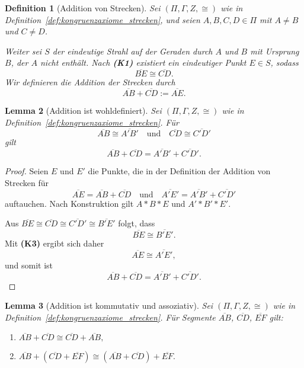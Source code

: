 \documentclass[a4paper,12pt]{article}
\theoremstyle{break}
\newtheorem{definition}{Definition}[section]
\newtheorem{lemma}[definition]{Lemma}
\begin{document}
\begin{definition}[Addition von Strecken]
Sei \((\Pi, \Gamma, Z, \cong)\) wie in Definition~\ref{def:kongruenzaxiome_strecken}, und seien \(A, B, C, D \in \Pi\) mit \(A \neq B\) und \(C \neq D\). 

Weiter sei \(S\) der eindeutige Strahl auf der Geraden durch \(A\) und \(B\) mit Ursprung \(B\), der \(A\) nicht enthält. Nach \textbf{(K1)} existiert ein eindeutiger Punkt \(E \in S\), sodass 
\[
\overline{BE} \cong \overline{CD}.
\]
Wir definieren die Addition der Strecken durch 
\[
\overline{AB} + \overline{CD} := \overline{AE}.
\]
\end{definition}

\begin{lemma}[Addition ist wohldefiniert]\label{lemma:addition_wohldef}
Sei \((\Pi, \Gamma, Z, \cong)\) wie in Definition~\ref{def:kongruenzaxiome_strecken}. Für 
\[
\overline{AB} \cong \overline{A'B'} \quad \text{und} \quad \overline{CD} \cong \overline{C'D'}
\]
gilt 
\[
\overline{AB} + \overline{CD} = \overline{A'B'} + \overline{C'D'}.
\]
\end{lemma}

\begin{proof}
Seien \(E\) und \(E'\) die Punkte, die in der Definition der Addition von Strecken für 
\[
\overline{AE} = \overline{AB} + \overline{CD} \quad \text{und} \quad \overline{A'E'} = \overline{A'B'} + \overline{C'D'}
\]
auftauchen. Nach Konstruktion gilt \(A * B * E\) und \(A' * B' * E'\). 

Aus \(\overline{BE} \cong \overline{CD} \cong \overline{C'D'} \cong \overline{B'E'}\) folgt, dass 
\[
\overline{BE} \cong \overline{B'E'}.
\]
Mit \textbf{(K3)} ergibt sich daher 
\[
\overline{AE} \cong \overline{A'E'},
\]
und somit ist 
\[
\overline{AB} + \overline{CD} = \overline{A'B'} + \overline{C'D'}.
\]
\end{proof}

\begin{lemma}[Addition ist kommutativ und assoziativ]\label{lemma:addition_komm_ass}
Sei \((\Pi, \Gamma, Z, \cong)\) wie in Definition~\ref{def:kongruenzaxiome_strecken}. Für Segmente \(\overline{AB}\), \(\overline{CD}\), \(\overline{EF}\) gilt:
\begin{enumerate}
    \item \(\overline{AB} + \overline{CD} \cong \overline{CD} + \overline{AB},\)
    \item \(\overline{AB} + (\overline{CD} + \overline{EF}) \cong (\overline{AB} + \overline{CD}) + \overline{EF}.\)
\end{enumerate}
\end{lemma}
\end{document}
